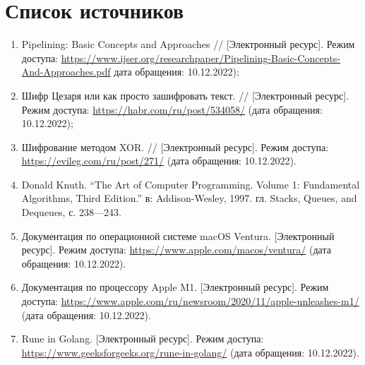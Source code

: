 %



\section*{\large Список источников}
\begin{enumerate}
	\item Pipelining: Basic Concepts and Approaches // [Электронный ресурс]. Режим доступа: \url{https://www.ijser.org/researchpaper/Pipelining-Basic-Concepts-And-Approaches.pdf} дата обращения: 10.12.2022); \label{bib:1}
	\item Шифр Цезаря или как просто зашифровать текст. // [Электронный ресурс]. Режим доступа: \url{https://habr.com/ru/post/534058/} (дата обращения: 10.12.2022); \label{bib:2}
	\item Шифрование методом XOR. // [Электронный ресурс]. Режим доступа: 
	\url{https://evileg.com/ru/post/271/} (дата обращения: 10.12.2022). \label{bib:3}
	\item Donald Knuth. “The Art of Computer Programming. Volume 1: Fundamental Algorithms, Third Edition.” в: Addison-Wesley, 1997. гл. Stacks, Queues, and Dequeues, с. 238—243.\label{bib:4}
	\item Документация по операционной системе macOS Ventura. [Электронный ресурс]. Режим доступа: \url{https://www.apple.com/macos/ventura/} (дата обращения: 10.12.2022). \label{bib:11}
	\item Документация по процессору Apple M1. [Электронный ресурс]. Режим доступа: \url{https://www.apple.com/ru/newsroom/2020/11/apple-unleashes-m1/} (дата обращения: 10.12.2022). \label{bib:12}
	\item Rune in Golang. [Электронный ресурс]. Режим доступа: \url{https://www.geeksforgeeks.org/rune-in-golang/} (дата обращения: 10.12.2022). \label{bib:7}
\end{enumerate}